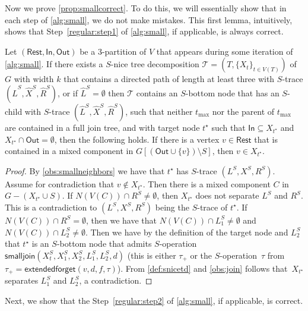 \documentclass[a4paper,UKenglish,cleveref, autoref, thm-restate, numberwithinsect]{lipics-v2021}
\newcommand{\smalljoin}{\mathsf{smalljoin}}
\newcommand{\extendedforget}{\mathsf{extendedforget}}
\newcommand{\slim}{\text{slim}\xspace}
\newcommand{\In}{\mathsf{In}}
\newcommand{\Out}{\mathsf{Out}}
\newcommand{\Rest}{\mathsf{Rest}}
\begin{document}
Now we prove \cref{prop:smallcorrect}. To do this, we will essentially show that in each step of \cref{alg:small}, we do not make mistakes. This first lemma, intuitively, shows that Step~\ref{regular:step1} of \cref{alg:small}, if applicable, is always correct.
\begin{lemma}\label{lem:regularstep1}
Let $(\Rest,\In,\Out)$ be a 3-partition of $V$ that appears during some iteration of \cref{alg:small}. 
If there exists a \slim $S$-nice tree decomposition $\mathcal{T}=(T,\{X_t\}_{t\in V(T)})$ of $G$ with width $k$ that contains a directed path of length at least three with $S$-trace $(\hat{L}^S, \hat{X}^S, \hat{R}^S)$, or if $\hat{L}^S=\emptyset$ then $\mathcal{T}$ contains an $S$-bottom node that has an $S$-child with $S$-trace $(\hat{L}^S, \hat{X}^S, \hat{R}^S)$, such that neither $t_{\max}$ nor the parent of $t_{\max}$ are contained in a full join tree, and with target node ${t^\star}$ such that $\In\subseteq X_{t^\star}$ and $X_{t^\star}\cap \Out=\emptyset$, then the following holds.
If there is a vertex $v\in \Rest$ that is contained in a mixed component in $G[(\Out\cup\{v\})\setminus S]$, then $v\in X_{t^\star}$.
\end{lemma}
\begin{proof}
By \cref{obs:smallneighbors} we have that ${t^\star}$ has $S$-trace $(L^S, X^S, R^S)$.
Assume for contradiction that $v\notin X_{t^\star}$. Then there is a mixed component $C$ in $G-(X_{t^\star}\cup S)$. If $N(V(C))\cap R^S\neq\emptyset$, then $X_{t^\star}$ does not separate $L^S$ and $R^S$. This is a contradiction to $(L^S, X^S, R^S)$ being the $S$-trace of ${t^\star}$. If $N(V(C))\cap R^S=\emptyset$, then we have that $N(V(C))\cap L_1^S\neq\emptyset$ and $N(V(C))\cap L_2^S\neq\emptyset$. Then we have by the definition of the target node and $L_2^S$ that ${t^\star}$ is an $S$-bottom node that admits $S$-operation $\smalljoin(X^S_t,X_1^S,X_2^S,L_{1}^S, L_{2}^S,d)$ (this is either $\tau_+$ or the $S$-operation~$\tau$ from $\tau_+=\extendedforget(v,d,f,\tau)$). From \cref{def:snicetd} and \cref{obs:join} follows that~$X_{t^\star}$ separates $L_1^S$ and $L_2^S$, a contradiction.
\end{proof}

Next, we show that the Step~\ref{regular:step2} of \cref{alg:small}, if applicable, is correct.
\end{document}
